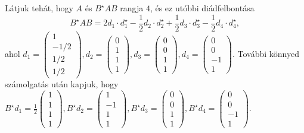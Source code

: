 \documentclass[a4paper, showtrims]{memoir}
\theoremstyle{plain}
\theoremstyle{remark}
\theoremstyle{definition}
\begin{document}
Látjuk tehát, hogy $A$ és $B^\star AB$ rangja $4$, és ez utóbbi diádfelbontása
\[
    B^\star AB=
    2d_1\cdot d_1^\star
    -\frac{1}{2}d_2\cdot d_2^\star+
    \frac{1}{2}d_3\cdot d_3^\star
    -\frac{1}{2}d_4\cdot d_4^\star,
\]
ahol 
$
d_1=
\begin{pmatrix}
    1\\ -1/2\\ 1/2\\ 1/2
\end{pmatrix}
,
d_2=
\begin{pmatrix}
    0\\ 1\\1\\1
\end{pmatrix}
,
d_3=
\begin{pmatrix}
    0\\ 0\\1\\1
\end{pmatrix}
,
d_4=
\begin{pmatrix}
    0\\ 0\\-1\\1
\end{pmatrix}.
$
További könnyed számolgatás után kapjuk, hogy
\(
B^\star d_1=
\frac{1}{2}
\begin{pmatrix}
    1\\1\\1\\1
\end{pmatrix}
,
B^\star d_2=
\begin{pmatrix}
    1\\-1\\1\\1
\end{pmatrix}
,
B^\star d_3=
\begin{pmatrix}
    0\\0\\1\\1
\end{pmatrix}
,
B^\star d_4=
\begin{pmatrix}
    0\\0\\-1\\1
\end{pmatrix}.
\)
\end{document}
